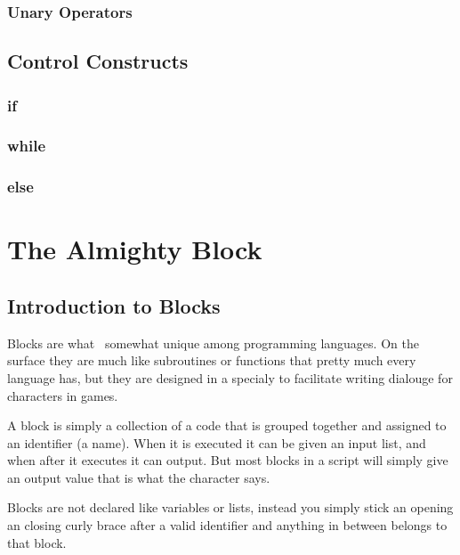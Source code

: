 \documentclass{book}
\begin{document}


\subsection{Unary Operators}


\section{Control Constructs}

\subsection{if}

\subsection{while}

\subsection{else}






\chapter{The Almighty Block}
\section{Introduction to Blocks}
Blocks are what \SSquared\ somewhat unique among programming languages.  On the surface they are much like subroutines or functions that pretty much every language has, but they are designed in a specialy to facilitate writing dialouge for characters in games.

A block is simply a collection of a code that is grouped together and assigned to an identifier (a name).  When it is executed it can be given an input list, and when after it executes it can output.  But most blocks in a script will simply give an output value that is what the character says.

Blocks are not declared like variables or lists, instead you simply stick an opening an closing curly brace after a valid identifier and anything in between belongs to that block.

\begin{SSCodeBox}
\scitea{\{} \\
\scitea{\hspace*{4em}}
\scitea{} \\
\scitea{\}}
\end{SSCodeBox}
\end{document}
